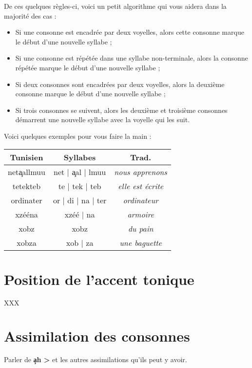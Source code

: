 De ces quelques règles-ci, voici un petit algorithme qui vous aidera dans la majorité des cas :
\begin{itemize}
    \item Si une consonne est encadrée par deux voyelles, alors cette consonne marque le début d'une nouvelle syllabe ;
    \item Si une consonne est répétée dans une syllabe non-terminale, alors la consonne répétée marque le début d'une nouvelle syllabe ;
    \item Si deux consonnes sont encadrées par deux voyelles, alors la deuxième consonne marque le début d'une nouvelle syllabe ;
    \item Si trois consonnes se suivent, alors les deuxième et troisième consonnes démarrent une nouvelle syllabe avec la voyelle qui les suit.
\end{itemize}

Voici quelques exemples pour vous faire la main :

\begin{center}
    \begin{tabular}{||c | c | c||} 
    \hline
    \textbf{Tunisien} & \textbf{Syllabes} & \textbf{Trad.}\\
    \hline\hline
    net\c{a}allmuu & net | \c{a}al | lmuu & \textit{nous apprenons}\\ 
    \hline
    tetekteb & te | tek | teb & \textit{elle est écrite}\\ 
    \hline
    ordinater & or | di | na | ter & \textit{ordinateur}\\ 
    \hline
    xzééna & xzéé | na & \textit{armoire}\\ 
    \hline
    xobz & xobz & \textit{du pain}\\ 
    \hline
    xobza & xob | za & \textit{une baguette}\\ 
    \hline
   \end{tabular}
\end{center}

\section{Position de l'accent tonique}
XXX

\section{Assimilation des consonnes}\label{Assimilation}
Parler de \textbf{\c{a}h > \textcrh\textcrh} et les autres assimilations qu'ils peut y avoir.

